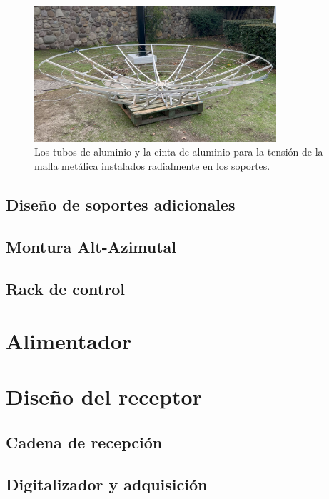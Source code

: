 \begin{figure}
    \centering
    \includegraphics[width=0.8\textwidth]{img/estructura2}
    \caption{Los tubos de aluminio y la cinta de aluminio para la tensión de la malla metálica instalados radialmente en los soportes.}
    \label{fig:ensamble3}
\end{figure}



\subsection{Diseño de soportes adicionales}

\subsection{Montura Alt-Azimutal}

\subsection{Rack de control}

\section{Alimentador}

\section{Diseño del receptor}

\subsection{Cadena de recepción}

\subsection{Digitalizador y adquisición}

